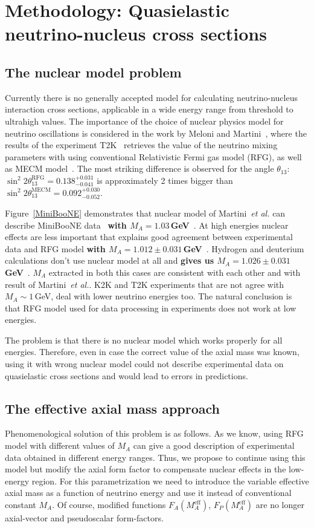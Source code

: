 \section{Methodology: Quasielastic neutrino-nucleus cross sections}
\subsection{The nuclear model problem}
Currently there is no generally accepted model for calculating neutrino-nucleus interaction cross sections, applicable in a wide energy range from threshold to ultrahigh values. The importance of the choice of nuclear physics model for neutrino oscillations is considered in the work by Meloni and Martini~\cite{Meloni:2012fq}, where the results of the experiment T2K~\cite{Abe:2011sj,Abe:2012gx} retrieves the value of the neutrino mixing parameters with using conventional Relativistic Fermi gas model (RFG), as well as MECM model~\cite{Martini:2009uj}. The most striking difference is observed for the angle $\theta_{13}$: $\sin^{2}2\theta_{13}^{\textrm{RFG}}=0.138^{+0.031}_{-0.041}$ is approximately 2 times bigger than $\sin^{2}2\theta_{13}^{\textrm{MECM}}=0.092^{+0.030}_{-0.052}$.

Figure~\ref{MiniBooNE} demonstrates that nuclear model of Martini~\textit{et al.} can describe MiniBooNE data~\cite{AguilarArevalo:2010zc} \textbf{with $M_A=1.03$\,GeV}~\cite{Martini:2011wp}. At high energies nuclear effects are less important that explains good agreement between experimental data and RFG model \textbf{with $M_A=1.012\pm{0.031}$\,GeV}~\cite{Kuzmin:2014}. Hydrogen and deuterium calculations don't use nuclear model at all and \textbf{gives us $M_A=1.026\pm{0.031}$\,GeV}~\cite{Kuzmin:2014}. $M_{A}$ extracted in both this cases are consistent with each other and with result of Martini~\textit{et al.}. K2K and T2K experiments that are not agree with $M_{A}\sim1$\,GeV, deal with lower neutrino energies too. The natural conclusion is that RFG model used for data processing in experiments does not work at low energies.

The problem is that there is no nuclear model which works properly for all energies. Therefore, even in case the correct value of the axial mass was known, using it with wrong nuclear model could not describe experimental data on quasielastic cross sections and would lead to errors in predictions.

\subsection{The effective axial mass approach}
Phenomenological solution of this problem is as follows. As we know, using RFG model with different values of $M_{A}$ can give a good description of experimental data obtained in different energy ranges. Thus, we propose to continue using this model but modify the axial form factor to compensate nuclear effects in the low-energy region. For this parametrization we need to introduce the variable effective axial mass as a function of neutrino energy and use it instead of conventional constant $M_{A}$. Of course, modified functions $F_{A}(M_{A}^\mathrm{eff})$, $F_{P}(M_{A}^\mathrm{eff})$ are no longer axial-vector and pseudoscalar form-factors.

